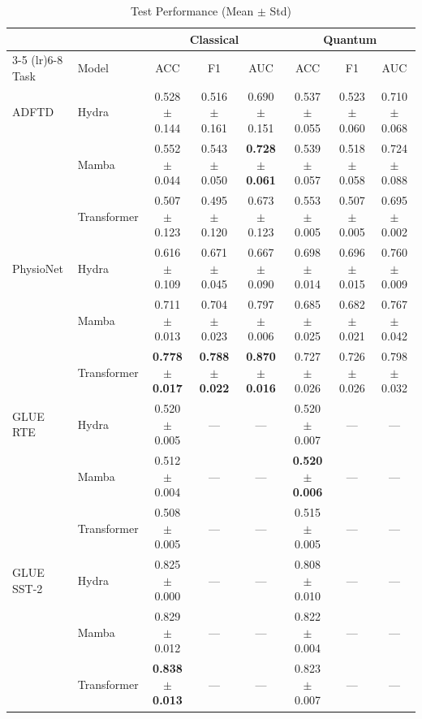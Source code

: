 \documentclass[conference]{IEEEtran}
\begin{document}
\begin{table}[t]
\centering
\caption{Test Performance (Mean $\pm$ Std)}
\label{tab:test_results}
\renewcommand{\arraystretch}{1.2}
\begin{tabular}{ll ccc ccc}
\toprule
& & \multicolumn{3}{c}{Classical} & \multicolumn{3}{c}{Quantum} \\
\cmidrule(lr){3-5} \cmidrule(lr){6-8}
Task & Model & ACC & F1 & AUC & ACC & F1 & AUC \\
\midrule
ADFTD
 & Hydra
   & 0.528 $\pm$ 0.144 & 0.516 $\pm$ 0.161 & 0.690 $\pm$ 0.151
   & 0.537 $\pm$ 0.055 & 0.523 $\pm$ 0.060 & 0.710 $\pm$ 0.068 \\
 & Mamba
   & 0.552 $\pm$ 0.044 & 0.543 $\pm$ 0.050 & \textbf{0.728 $\pm$ 0.061}
   & 0.539 $\pm$ 0.057 & 0.518 $\pm$ 0.058 & 0.724 $\pm$ 0.088 \\
 & Transformer
   & 0.507 $\pm$ 0.123 & 0.495 $\pm$ 0.120 & 0.673 $\pm$ 0.123
   & 0.553 $\pm$ 0.005 & 0.507 $\pm$ 0.005 & 0.695 $\pm$ 0.002 \\
\midrule
PhysioNet
 & Hydra
   & 0.616 $\pm$ 0.109 & 0.671 $\pm$ 0.045 & 0.667 $\pm$ 0.090
   & 0.698 $\pm$ 0.014 & 0.696 $\pm$ 0.015 & 0.760 $\pm$ 0.009 \\
 & Mamba
   & 0.711 $\pm$ 0.013 & 0.704 $\pm$ 0.023 & 0.797 $\pm$ 0.006
   & 0.685 $\pm$ 0.025 & 0.682 $\pm$ 0.021 & 0.767 $\pm$ 0.042 \\
 & Transformer
   & \textbf{0.778 $\pm$ 0.017} & \textbf{0.788 $\pm$ 0.022} & \textbf{0.870 $\pm$ 0.016}
   & 0.727 $\pm$ 0.026 & 0.726 $\pm$ 0.026 & 0.798 $\pm$ 0.032 \\
\midrule
GLUE RTE
 & Hydra
   & 0.520 $\pm$ 0.005 & --- & ---
   & 0.520 $\pm$ 0.007 & --- & --- \\
 & Mamba
   & 0.512 $\pm$ 0.004 & --- & ---
   & \textbf{0.520 $\pm$ 0.006} & --- & --- \\
 & Transformer
   & 0.508 $\pm$ 0.005 & --- & ---
   & 0.515 $\pm$ 0.005 & --- & --- \\
\midrule
GLUE SST-2
 & Hydra
   & 0.825 $\pm$ 0.000 & --- & ---
   & 0.808 $\pm$ 0.010 & --- & --- \\
 & Mamba 
   & 0.829 $\pm$ 0.012 & --- & ---
   & 0.822 $\pm$ 0.004 & --- & --- \\
 & Transformer 
   & \textbf{0.838 $\pm$ 0.013} & --- & ---
   & 0.823 $\pm$ 0.007 & --- & --- \\
\bottomrule
\end{tabular}
\end{table}
\end{document}

